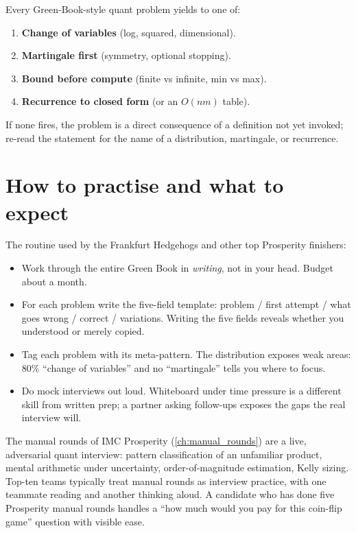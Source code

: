 \begin{keyfactbox}
Every Green-Book-style quant problem yields to one of:
\begin{enumerate}
  \item \textbf{Change of variables} (log, squared, dimensional).
  \item \textbf{Martingale first} (symmetry, optional stopping).
  \item \textbf{Bound before compute} (finite vs infinite, min vs max).
  \item \textbf{Recurrence to closed form} (or an $O(nm)$ table).
\end{enumerate}
If none fires, the problem is a direct consequence of a definition
not yet invoked; re-read the statement for the name of a
distribution, martingale, or recurrence.
\end{keyfactbox}

\section{How to practise and what to expect}
\label{sec:prepare}

The routine used by the Frankfurt Hedgehogs
\citep{frankfurthedgehogs2025} and other top Prosperity finishers:

\begin{itemize}
  \item Work through the entire Green Book \citeGreenBook{} in
    \emph{writing}, not in your head.  Budget about a month.
  \item For each problem write the five-field template: problem /
    first attempt / what goes wrong / correct / variations.
    Writing the five fields reveals whether you understood or
    merely copied.
  \item Tag each problem with its meta-pattern.  The distribution
    exposes weak areas: 80\% ``change of variables'' and no
    ``martingale'' tells you where to focus.
  \item Do mock interviews out loud.  Whiteboard under time
    pressure is a different skill from written prep; a partner
    asking follow-ups exposes the gaps the real interview will.
\end{itemize}

\begin{prosperitybox}[title={Prosperity skills are interview skills}]
The manual rounds of IMC Prosperity (\cref{ch:manual_rounds}) are
a live, adversarial quant interview: pattern classification of an
unfamiliar product, mental arithmetic under uncertainty,
order-of-magnitude estimation, Kelly sizing.  Top-ten teams
typically treat manual rounds as interview practice, with one
teammate reading and another thinking aloud.  A candidate who has
done five Prosperity manual rounds handles a ``how much would you
pay for this coin-flip game'' question with visible ease.
\end{prosperitybox}


